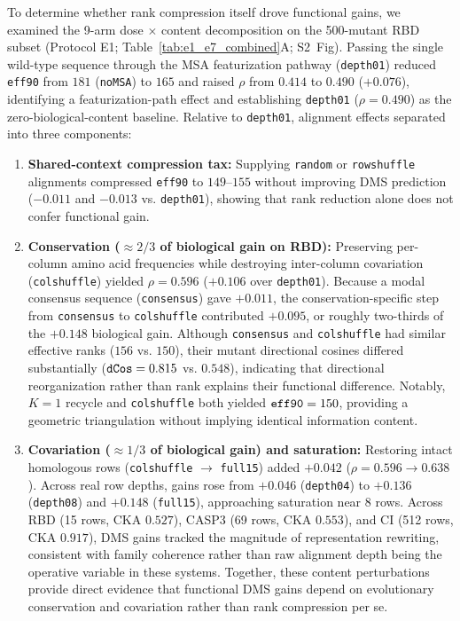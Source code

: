 \documentclass[10pt,a4paper]{article}
\begin{document}
To determine whether rank compression itself drove functional gains, we examined the 9-arm dose $\times$ content decomposition on the 500-mutant RBD subset (Protocol E1; Table~\ref{tab:e1_e7_combined}A; S2~Fig). Passing the single wild-type sequence through the MSA featurization pathway (\texttt{depth01}) reduced \texttt{eff90} from $181$ (\texttt{noMSA}) to $165$ and raised $\rho$ from $0.414$ to $0.490$ ($+0.076$), identifying a featurization-path effect and establishing \texttt{depth01} ($\rho = 0.490$) as the zero-biological-content baseline. Relative to \texttt{depth01}, alignment effects separated into three components:
\begin{enumerate}
    \setlength{\itemsep}{2pt}\setlength{\parskip}{0pt}
    \item \textbf{Shared-context compression tax:} Supplying \texttt{random} or \texttt{rowshuffle} alignments compressed \texttt{eff90} to $149$--$155$ without improving DMS prediction ($-0.011$ and $-0.013$ vs. \texttt{depth01}), showing that rank reduction alone does not confer functional gain.
    \item \textbf{Conservation ($\approx 2/3$ of biological gain on RBD):} Preserving per-column amino acid frequencies while destroying inter-column covariation (\texttt{colshuffle}) yielded $\rho = 0.596$ ($+0.106$ over \texttt{depth01}). Because a modal consensus sequence (\texttt{consensus}) gave $+0.011$, the conservation-specific step from \texttt{consensus} to \texttt{colshuffle} contributed $+0.095$, or roughly two-thirds of the $+0.148$ biological gain. Although \texttt{consensus} and \texttt{colshuffle} had similar effective ranks ($156$ vs. $150$), their mutant directional cosines differed substantially ($\text{\texttt{dCos}} = 0.815$ vs. $0.548$), indicating that directional reorganization rather than rank explains their functional difference. Notably, $K=1$ recycle and \texttt{colshuffle} both yielded $\text{\texttt{eff90}} = 150$, providing a geometric triangulation without implying identical information content.
    \item \textbf{Covariation ($\approx 1/3$ of biological gain) and saturation:} Restoring intact homologous rows (\texttt{colshuffle} $\rightarrow$ \texttt{full15}) added $+0.042$ ($\rho = 0.596 \rightarrow 0.638$). Across real row depths, gains rose from $+0.046$ (\texttt{depth04}) to $+0.136$ (\texttt{depth08}) and $+0.148$ (\texttt{full15}), approaching saturation near 8 rows. Across RBD (15 rows, CKA $0.527$), CASP3 (69 rows, CKA $0.553$), and CI (512 rows, CKA $0.917$), DMS gains tracked the magnitude of representation rewriting, consistent with family coherence rather than raw alignment depth being the operative variable in these systems. Together, these content perturbations provide direct evidence that functional DMS gains depend on evolutionary conservation and covariation rather than rank compression per se.
\end{enumerate}
\end{document}
